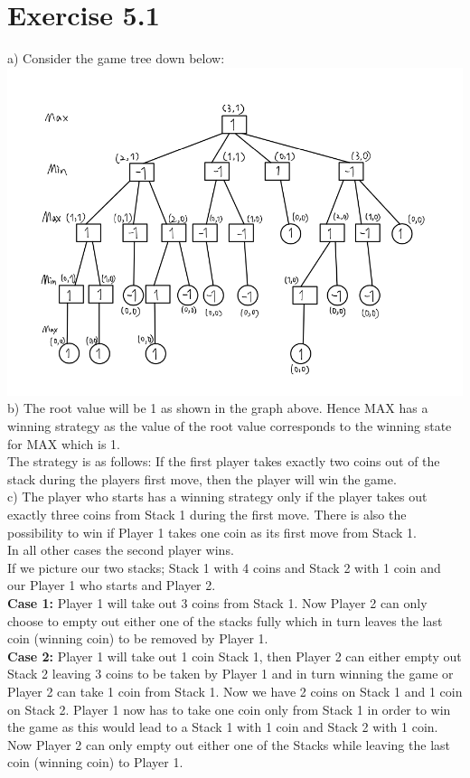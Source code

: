 \documentclass[12pt]{article}
\begin{document}
\section*{Exercise 5.1}
a) Consider the game tree down below: \\
\includegraphics[width=\textwidth]{figures/5.1a_b.png}\\
b) The root value will be 1 as shown in the graph above. Hence MAX has a winning strategy as the value of the root value corresponds to the winning state for MAX which is 1. \\
The strategy is as follows: If the first player takes exactly two coins out of the stack during the players first move, then the player will win the game.\\
c) The player who starts has a winning strategy only if the player takes out exactly three coins from Stack 1 during the first move. There is also the possibility to win if Player 1 takes one coin as its first move from Stack 1.\\ 
In all other cases the second player wins.\\
If we picture our two stacks; Stack 1 with 4 coins and Stack 2 with 1 coin and our Player 1 who starts and Player 2.\\
\textbf{Case 1:} Player 1 will take out 3 coins from Stack 1. Now Player 2 can only choose to empty out either one of the stacks fully which in turn leaves the last coin (winning coin) to be removed by Player 1.\\
\textbf{Case 2:} Player 1 will take out 1 coin Stack 1, then Player 2 can either empty out Stack 2 leaving 3 coins to be taken by Player 1 and in turn winning the game or Player 2 can take 1 coin from Stack 1. Now we have 2 coins on Stack 1 and 1 coin on Stack 2. Player 1 now has to take one coin only from Stack 1 in order to win the game as this would lead to a Stack 1 with 1 coin and Stack 2 with 1 coin. Now Player 2 can only empty out either one of the Stacks while leaving the last coin (winning coin) to Player 1.\\
\end{document}
